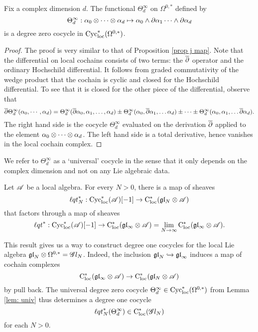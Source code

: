 \begin{lem}
\label{lem: univ}
Fix a complex dimension $d$. 
The functional $\Theta^\infty_d$ on $\Omega^{0,*}$ defined by
\[
\Theta^\infty_d : \alpha_0 \otimes \cdots \otimes \alpha_d \mapsto \alpha_0 \wedge \partial \alpha_1 \cdots \wedge \partial \alpha_d
\]
is a degree zero cocycle in ${\rm Cyc}_{\rm loc}^*(\Omega^{0,*})$. 
\end{lem}
\begin{proof}
The proof is very similar to that of Proposition \ref{prop j map}. 
Note that the differential on local cochains consists of two terms: the $\overline{\partial}$ operator and the ordinary Hochschild differential. 
It follows from graded commutativity of the wedge product that the cochain is cyclic and closed for the Hochschild differential. 
To see that it is closed for the other piece of the differential, observe that
\[
\overline{\partial} \Theta^\infty_d(\alpha_0,\cdots,\alpha_d) = \Theta^\infty_d(\overline{\partial} \alpha_0, \alpha_1,\ldots,\alpha_d) \pm \Theta_d^\infty(\alpha_0, \overline{\partial} \alpha_1,\ldots \alpha_d) \pm \cdots \pm \Theta_d^\infty(\alpha_0, \alpha_1,\ldots \overline{\partial} \alpha_d) .
\]
The right hand side is the cocycle $\Theta_d^\infty$ evaluated on the derivation $\overline{\partial}$ applied to the element $\alpha_0 \otimes \cdots \otimes \alpha_d$. 
The left hand side is a total derivative, hence vanishes in the local cochain complex. 
\end{proof}

We refer to $\Theta^\infty_d$ as a `universal' cocycle in the sense that it only depends on the complex dimension and not on any Lie algebraic data. 


\begin{prop}
Let $\mathscr A$ be a local algebra.
For every $N > 0$, there is a map of sheaves
\[
{\ell q t}_N^* : {\rm Cyc}_{\rm loc}^*(\mathscr A)[-1] \to {\rm C}_{\rm loc}^*(\mathfrak{g} \mathfrak{l}_N \otimes \mathscr A) 
\] 
that factors through a map of sheaves
\[
{\ell q t}^* : {\rm Cyc}_{\rm loc}^*(\mathscr A)[-1] \to {\rm C}_{\rm loc}^*(\mathfrak{g} \mathfrak{l}_\infty \otimes \mathscr A) = \lim_{N \to \infty} {\rm C}_{\rm loc}^*(\mathfrak{g} \mathfrak{l}_\infty \otimes \mathscr A)  .
\]
\end{prop}


This result gives us a way to construct degree one cocycles for the local Lie algebra ${\mathfrak{gl}}_N \otimes \Omega^{0,*} = \mathscr G l_{N}$. 
Indeed, the inclusion ${\mathfrak{gl}}_N \hookrightarrow {\mathfrak{gl}}_\infty$ induces a map of cochain complexes 
\[
{\rm C}_{\rm loc}^*(\mathfrak{g} \mathfrak{l}_\infty \otimes \mathscr A) \to {\rm C}_{\rm loc}^*(\mathfrak{g} \mathfrak{l}_N \otimes \mathscr A)
\]
by pull back. 
The universal degree zero cocycle $\Theta_d^\infty \in {\rm Cyc}_{\rm loc}^*(\Omega^{0,*})$ from Lemma \ref{lem: univ} thus determines a degree one cocycle 
\[
{\ell q t}^*_N(\Theta_d^\infty) \in {\rm C}_{\rm loc}^*(\mathscr G l_N)
\]
for each $N > 0$. 


